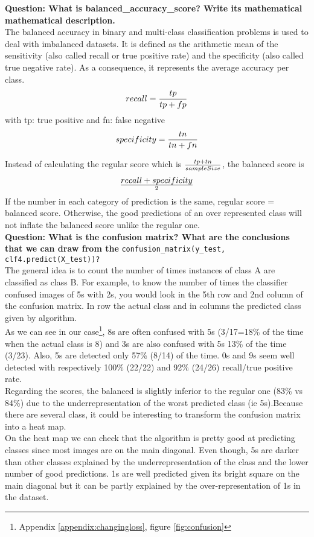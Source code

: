 \textbf{Question: What is balanced\_accuracy\_score? Write its mathematical mathematical description.} \\

The balanced accuracy in binary and multi-class classification problems is used to deal with imbalanced datasets. 
It is defined as the arithmetic mean of the sensitivity (also called recall or true positive rate) and the specificity (also called true negative rate). As a consequence, it represents the average accuracy per class.
\begin{equation*} recall = {tp\over tp + fp}\end{equation*} 
with tp: true positive and fn: false negative
\begin{equation*} specificity = {tn\over tn + fn}\end{equation*} 

Instead of calculating the regular score which is $tp+tn \over sampleSize$, the balanced score is 
\begin{equation*}
	recall+specificity \over 2
\end{equation*}
If the number in each category of prediction is the same, regular score = balanced score. Otherwise, the good predictions of an over represented class will not inflate the balanced score unlike the regular one.\\


\textbf{Question: What is the confusion matrix? What are the conclusions that we can draw from the} \verb|confusion_matrix(y_test, clf4.predict(X_test))?| \\

The general idea is to count the number of times instances of class A are classified as class B. For example, to know the number of times the classifier confused images of 5s with 2s, you would look in the 5th row and 2nd column of the confusion matrix. In row the actual class and in columns the predicted class given by algorithm. \\

As we can see in our case\footnote{Appendix \ref{appendix:changingloss}, figure \ref{fig:confusion}}, 8s are often confused with 5s (3/17=18\% of the time when the actual class is 8) and 3s are also confused with 5s 13\% of the time (3/23). Also, 5s are detected only 57\% (8/14) of the time. 0s and 9s seem well detected with respectively 100\% (22/22) and 92\% (24/26) recall/true positive rate.\\

Regarding the scores, the balanced is slightly inferior to the regular one (83\% vs 84\%) due to the underrepresentation of the worst predicted class (ie 5s).Because there are several class, it could be interesting to transform the confusion matrix into a heat map. \\

On the heat map we can check that the algorithm is pretty good at predicting classes since most images are on the main diagonal. Even though, 5s are darker than other classes explained by the underrepresentation of the class and the lower number of good predictions. 1s are well predicted given its bright square on the main diagonal but it can be partly explained by the over-representation of 1s in the dataset. 



